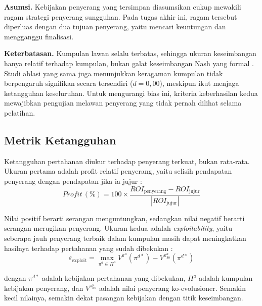 \textbf{Asumsi.} Kebijakan penyerang yang tersimpan diasumsikan cukup mewakili ragam strategi penyerang sungguhan. Pada tugas akhir ini, ragam tersebut diperluas dengan dua tujuan penyerang, yaitu mencari keuntungan dan mengganggu finalisasi.

\textbf{Keterbatasan.} Kumpulan lawan selalu terbatas, sehingga ukuran keseimbangan hanya relatif terhadap kumpulan, bukan galat keseimbangan Nash yang formal \parencite{wushishi2026coadam}. Studi ablasi yang sama juga menunjukkan keragaman kumpulan tidak berpengaruh signifikan secara tersendiri ($d = 0{,}00$), meskipun ikut menjaga ketangguhan keseluruhan. Untuk mengurangi bias ini, kriteria keberhasilan kedua mewajibkan pengujian melawan penyerang yang tidak pernah dilihat selama pelatihan.

\subsection{Metrik Ketangguhan}
\label{subsec:metrik}
Ketangguhan pertahanan diukur terhadap penyerang terkuat, bukan rata-rata. Ukuran pertama adalah profit relatif penyerang, yaitu selisih pendapatan penyerang dengan pendapatan jika ia jujur \parencite{skowronski2026adaptive}:
\begin{equation}
\textit{Profit}\,(\%) = 100 \times \frac{\textit{ROI}_{\text{penyerang}} - \textit{ROI}_{\text{jujur}}}{\left|\textit{ROI}_{\text{jujur}}\right|}
\label{eq:profit_relatif}
\end{equation}

\noindent Nilai positif berarti serangan menguntungkan, sedangkan nilai negatif berarti serangan merugikan penyerang. Ukuran kedua adalah \textit{exploitability}, yaitu seberapa jauh penyerang terbaik dalam kumpulan masih dapat meningkatkan hasilnya terhadap pertahanan yang sudah dibekukan \parencite{wushishi2026coadam}:
\begin{equation}
\varepsilon_{\text{exploit}} = \max_{\pi^{a} \in \Pi^{a}} V^{\pi^{a}}(\pi^{d*}) - V^{\pi^{a}_{\text{ko}}}(\pi^{d*})
\label{eq:exploitability}
\end{equation}

\noindent dengan $\pi^{d*}$ adalah kebijakan pertahanan yang dibekukan, $\Pi^{a}$ adalah kumpulan kebijakan penyerang, dan $V^{\pi^{a}_{\text{ko}}}$ adalah nilai penyerang ko-evolusioner. Semakin kecil nilainya, semakin dekat pasangan kebijakan dengan titik keseimbangan.


